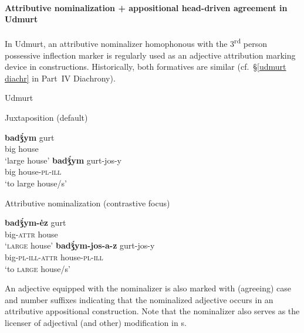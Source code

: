 \paragraph*{Attributive nominalization + appositional head\hyp{}driven agreement in Udmurt}
\label{udmurt synchr}
In Udmurt, an attributive nominalizer homophonous with the 3\textsuperscript{rd} person possessive inflection marker is regularly used as an adjective attribution marking device in  constructions. Historically, both formatives are similar (cf.~\S\ref{udmurt diachr} in Part~IV Diachrony).
\begin{exe}
\ex \rm{Udmurt \citep{winkler2001}}
\begin{xlist}
\ex \rm{Juxtaposition (default)}
\begin{xlist}
\ex
\gll	\textbf{badǯ́ym} gurt\\
	big house\\
\glt	‘large house’
\ex	
\gll	\textbf{badǯ́ym} gurt-jos-y\\
	big house-\textsc{pl}-\textsc{ill}\\
\glt	‘to large house/s’
\end{xlist}
\ex \rm{Attributive nominalization (contrastive focus)}
\begin{xlist}
\ex
\gll	\textbf{badǯ́ym-ėz} gurt\\
	big-\textsc{attr} house\\
\glt	‘\textsc{large} house’
\ex	
\gll	\textbf{badǯ́ym-jos-a-z} gurt-jos-y\\
	big-\textsc{pl}-\textsc{ill}-\textsc{attr} house-\textsc{pl}-\textsc{ill}\\
\glt	‘to \textsc{large} house/s’
\end{xlist}
\end{xlist}
\end{exe}
An adjective equipped with the nominalizer is also marked with (agreeing) case and number suffixes indicating that the nominalized adjective occurs in an attributive appositional construction. Note that the nominalizer also serves as the licenser of adjectival (and other) modification in s.
